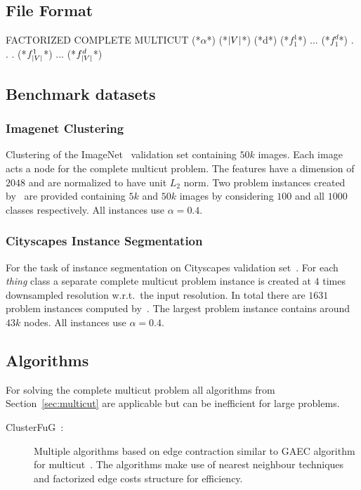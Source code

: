 \subsection{File Format}
\begin{fileformat}
FACTORIZED COMPLETE MULTICUT
(*$\alpha$*)
(*$\lvert V\rvert$*) (*d*)
(*$f_1^1$*) ... (*$f_1^d$*)
.
.
.
(*$f_{\lvert V\rvert}^1$*) ... (*$f_{\lvert V\rvert}^d$*)
\end{fileformat}
\subsection{Benchmark datasets}

\subsubsection{Imagenet Clustering}
Clustering of the ImageNet~\cite{deng2009imagenet} validation set containing $50k$ images. Each image acts a node for the complete multicut problem. The features have a dimension of $2048$ and are normalized to have unit $L_2$ norm. Two problem instances created by~\cite{aabbas23_clusterfug} are provided containing $5k$ and $50k$ images by considering $100$ and all $1000$ classes respectively. All instances use $\alpha = 0.4$.

\subsubsection{Cityscapes Instance Segmentation}
For the task of instance segmentation on Cityscapes validation set~\cite{cordts2016cityscapes}. For each \textit{thing} class a separate complete multicut problem instance is created at $4$ times downsampled resolution w.r.t.\ the input resolution. 
In total there are $1631$ problem instances computed by~\cite{aabbas23_clusterfug}. The largest problem instance contains around $43k$ nodes. All instances use $\alpha = 0.4$.
\subsection{Algorithms}
For solving the complete multicut problem all algorithms from Section~\ref{sec:multicut} are applicable but can be inefficient for large problems. 
\begin{description}
\item[ClusterFuG~\cite{aabbas23_clusterfug}:] Multiple algorithms based on edge contraction similar to GAEC algorithm for multicut~\cite{keuper2015efficient}. The algorithms make use of nearest neighbour techniques and factorized edge costs structure for efficiency.
\end{description}
